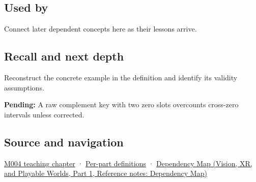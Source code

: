 \subsection{Used by}\label{appendix-deca299ae4b8-used-by}

\hypertarget{appendix-deca299ae4b8-used-by}{}

Connect later dependent concepts here as their lessons arrive.

\subsection{Recall and next depth}\label{appendix-deca299ae4b8-recall-and-next-depth}

\hypertarget{appendix-deca299ae4b8-recall-and-next-depth}{}

Reconstruct the concrete example in the definition and identify its validity assumptions.

\textbf{Pending:} A raw complement key with two zero slots overcounts cross-zero intervals unless corrected.

\subsection{Source and navigation}\label{appendix-deca299ae4b8-source-and-navigation}

\hypertarget{appendix-deca299ae4b8-source-and-navigation}{}

\hyperref[01-foundations-i-ch001-a-stretching-ruler-for-real-valued-quantities]{M004 teaching chapter} · \hyperref[appendix-fd090d982a15-m004---parts-61-76]{Per-part definitions} · \href{../07-Vision-XR-and-Playable-Worlds-P01/main.pdf\#nameddest=appendix-4ad47bdd269a}{Dependency Map (Vision, XR, and Playable Worlds, Part 1, Reference notes: Dependency Map)}
